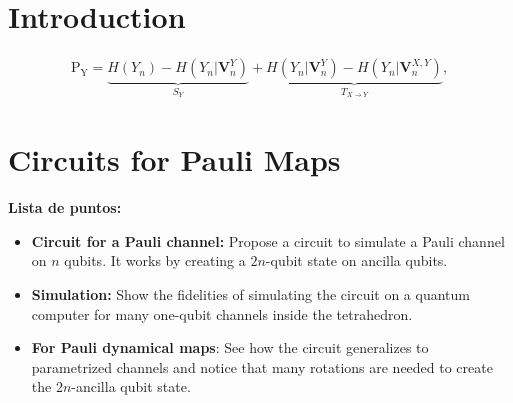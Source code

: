 \documentclass[10pt,letterpaper]{article}
\begin{document}

\linenumbers

\section*{Introduction}



\begin{eqnarray}
\label{eq:schemeP}
	\mathrm{P_Y} = \underbrace{H(Y_n) - H(Y_n|\mathbf{V}^{Y}_{n})}_{S_Y} + \underbrace{H(Y_n|\mathbf{V}^{Y}_{n})- H(Y_n|\mathbf{V}^{X,Y}_{n})}_{T_{X\rightarrow Y}},
\end{eqnarray}

\section*{Circuits for Pauli Maps}
\label{sec: Circuits for Pauli Maps}

\textbf{Lista de puntos:}
\begin{itemize}
\item \textbf{Circuit for a Pauli channel:}  Propose a circuit to simulate a Pauli channel on $n$ qubits. It works by creating a $2n$-qubit state on ancilla qubits.
\item \textbf{Simulation:} Show the fidelities of simulating the circuit on a quantum computer for many one-qubit channels inside the tetrahedron.
\item \textbf{For Pauli dynamical maps}: See how the circuit generalizes to parametrized channels and notice that many rotations are needed to create the $2n$-ancilla qubit state. \\
\end{itemize}
\end{document}

